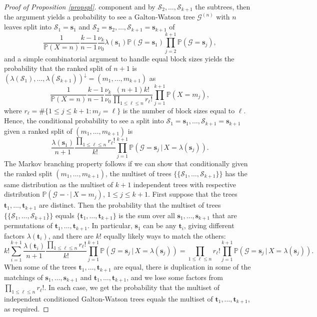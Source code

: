 \documentclass[11pt,a4paper]{article}
\newcommand{\bP}{\mathbb{P}}
\newcommand{\cG}{\mathcal{G}}
\newcommand{\cS}{\mathcal{S}}
\newcommand{\fs}{\mathbf{s}}
\newcommand{\ft}{\mathbf{t}}
\begin{document}
\begin{proof}[Proof of Proposition \ref{propspl}]
  component and by $\cS_2,\ldots,\cS_{k+1}$ the subtrees, then the argument yields a probability to see a Galton-Watson tree $\cG^{(n)}$ with $n$ leaves split into $\cS_1=\fs_1$
  and $\cS_2=\fs_2,\ldots,\cS_{k+1}=\fs_{k+1}$ of
  $$\frac{1}{\bP(X=n)}\frac{k-1}{n-1}\frac{\nu_k}{\nu_0}\lambda(\fs_1)\bP(\cG=\fs_1)\prod_{j=2}^{k+1}\bP(\cG=\fs_j),$$
  and a simple combinatorial argument to handle equal block sizes yields the probability that the ranked split of $n+1$ is $(\lambda(\cS_1),\ldots,\lambda(\cS_{k+1}))^\downarrow=(m_1,\ldots,m_{k+1})$ as
  $$\frac{1}{\bP(X=n)}\frac{k-1}{n-1}\frac{\nu_k}{\nu_0}\frac{(n+1)k!}{\prod_{1\le\ell\le n}r_\ell!}\prod_{j=1}^{k+1}\bP(X=m_j),$$
  where $r_\ell=\#\{1\le j\le k+1\colon m_j=\ell\}$ is the number of block sizes equal to $\ell$. Hence, the conditional probability to see a split into
  $\cS_1=\fs_1,\ldots,\cS_{k+1}=\fs_{k+1}$ given a ranked split of $(m_1,\ldots,m_{k+1})$ is
  $$\frac{\lambda(\fs_1)}{n+1}\frac{\prod_{1\le\ell\le n}r_\ell!}{k!}\prod_{j=1}^{k+1}\bP(\cG=\fs_j\,|\,X=\lambda(\fs_j)).$$
  The Markov branching property follows if we can show that conditionally given the ranked split $(m_1,\ldots,m_{k+1})$, the multiset of trees $\{\!\{\cS_1,\ldots,\cS_{k+1}\}\!\}$
  has the same distribution as the multiset of $k+1$ independent trees with respective distribution $\bP(\cG=\cdot\,|\,X=m_j)$, $1\le j\le k+1$. First suppose that the trees
  $\ft_1,\ldots,\ft_{k+1}$ are distinct. Then the probability that the multiset of trees $\{\!\{\cS_1,\ldots,\cS_{k+1}\}\!\}$ equals $\{\ft_1,\ldots,\ft_{k+1}\}$ is the sum over all
  $\fs_1,\ldots,\fs_{k+1}$ that are permutations of $\ft_1,\ldots,\ft_{k+1}$. In particular, $\fs_1$ can be any $\ft_i$, giving different factors $\lambda(\ft_i)$, and there are $k!$
  equally likely ways to match the others:
  $$k!\sum_{i=1}^{k+1}\frac{\lambda(\ft_i)}{n+1}\frac{\prod_{1\le\ell\le n}r_\ell!}{k!}\prod_{j=1}^{k+1}\bP(\cG=\fs_j\,|\,X=\lambda(\fs_j))=\prod_{1\le\ell\le n}r_\ell!\prod_{j=1}^{k+1}\bP(\cG=\fs_j\,|\,X=\lambda(\fs_j)).$$
  When some of the trees $\ft_1,\ldots,\ft_{k+1}$ are equal, there is duplication in some of the matchings of $\fs_1,\ldots,\fs_{k+1}$ and $\ft_1,\ldots,\ft_{k+1}$, and we lose some factors from $\prod_{1\le\ell\le n}r_\ell!$.
  In each case, we get the probability that the multiset of independent conditioned Galton-Watson trees equals the multiset of $\ft_1,\ldots,\ft_{k+1}$, as required.
\end{proof}
\end{document}
